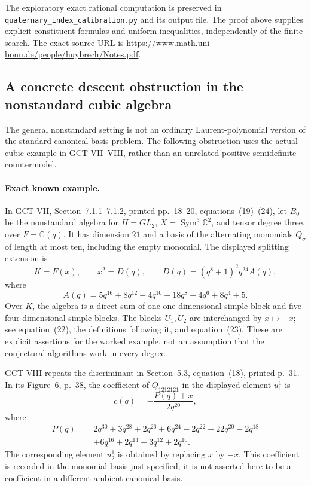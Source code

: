 \documentclass[11pt,a4paper]{article}
\begin{document}
The exploratory exact rational computation is preserved in
\texttt{quaternary\_index\_calibration.py} and its output file.
The proof above supplies explicit constituent formulas and
uniform inequalities, independently of the finite search.
The exact source URL is
\url{https://www.math.uni-bonn.de/people/huybrech/Notes.pdf}.


\subsection{A concrete descent obstruction in the nonstandard cubic algebra}

The general nonstandard setting is not an ordinary Laurent-polynomial
version of the standard canonical-basis problem. The following obstruction
uses the actual cubic example in GCT VII--VIII, rather than an unrelated
positive-semidefinite countermodel.

\paragraph{Exact known example.}
In GCT VII, Section~7.1.1--7.1.2, printed pp.~18--20,
equations~(19)--(24), let $B_0$ be the nonstandard algebra for
$H=GL_2$, $X=\operatorname{Sym}^3\mathbb C^2$, and tensor degree three,
over $F=\mathbb C(q)$. It has dimension $21$ and a basis of the
alternating monomials $Q_\sigma$ of length at most ten, including
the empty monomial. The displayed splitting extension is
\[
 K=F(x),\qquad x^2=D(q),\qquad
 D(q)=(q^8+1)^2q^{24}A(q),
 \tag{P-F36a}
\]
where
\[
 A(q)=5q^{16}+8q^{12}-4q^{10}+18q^8-4q^6+8q^4+5.
 \tag{P-F36b}
\]
Over $K$, the algebra is a direct sum of one one-dimensional
simple block and five four-dimensional simple blocks.
The blocks $U_1,U_2$ are interchanged by $x\mapsto-x$;
see equation~(22), the definitions following it, and equation~(23).
These are explicit assertions for the worked example, not an
assumption that the conjectural algorithms work in every degree.

GCT VIII repeats the discriminant in Section~5.3, equation~(18),
printed p.~31. In its Figure~6, p.~38, the coefficient of
$Q_{1212121}$ in the displayed element $u_1^1$ is
\[
 c(q)=-\frac{P(q)+x}{2q^{20}},
 \tag{P-F36c}
\]
where
\[
 \begin{split}
 P(q)={}&2q^{30}+3q^{28}+2q^{26}+6q^{24}-2q^{22}
          +22q^{20}-2q^{18}\\
       &+6q^{16}+2q^{14}+3q^{12}+2q^{10}.
 \end{split}
\]
The corresponding element $u_2^1$ is obtained by replacing $x$ by
$-x$. This coefficient is recorded in the monomial basis just
specified; it is not asserted here to be a coefficient in a
different ambient canonical basis.
\end{document}
